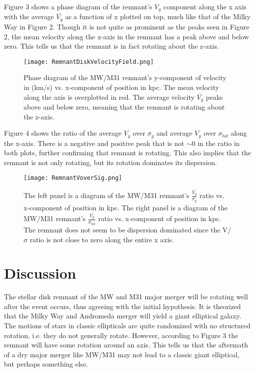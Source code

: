 \documentclass[twocolumn]{aastex63}
\begin{document}

Figure 3 shows a phase diagram of the remnant's $V_y$ component along the x axis with the average $\bar{V_y}$ as a function of x plotted on top, much like that of the Milky Way in Figure 2.  Though it is not quite as prominent as the peaks seen in Figure 2, the mean velocity along the x-axis in the remnant has a peak above and below zero.  This tells us that the remnant is in fact rotating about the z-axis.

\begin{figure}
    \centering
    \texttt{[image: RemnantDiskVelocityField.png]}
    \caption{Phase diagram of the MW/M31 remnant's y-component of velocity in (km/s) vs. x-component of position in kpc.  The mean velocity along the axis is overplotted in red.  The average velocity $\bar{V_y}$ peaks above and below zero, meaning that the remnant is rotating about the z-axis.}
    \label{fig:my_label}
\end{figure}

Figure 4 shows the ratio of the average $V_y$ over $\sigma_{y}$ and average $V_y$ over $\sigma_{tot}$ along the x-axis.  There is a negative and positive peak that is not $\sim$0 in the ratio in both plots, further confirming that remnant is rotating.  This also implies that the remnant is not only rotating, but its rotation dominates its dispersion.  

\begin{figure}
    \centering
    \texttt{[image: RemnantVoverSig.png]}
    \caption{The left panel is a diagram of the MW/M31 remnant's $\frac{\bar{V_y}}{\sigma_y}$ ratio vs. x-component of position in kpc.
    The right panel is a diagram of the MW/M31 remnant's $\frac{\bar{V_y}}{\sigma_{tot}}$ ratio vs. x-component of position in kpc. The remnant does not seem to be dispersion dominated since the V/$\sigma$ ratio is not close to zero along the entire x axis.}
    \label{fig:my_label}
\end{figure}

\section{Discussion} \label{sec:style}

The stellar disk remnant of the MW and M31 major merger will be rotating well after the event occurs, thus agreeing with the initial hypothesis.  It is theorized that the Milky Way and Andromeda merger will yield a giant elliptical galaxy. The motions of stars in classic ellipticals are quite randomized with no structured rotation, i.e. they do not generally rotate.  However, according to Figure 3 the remnant will have some rotation around an axis.  This tells us that the aftermath of a dry major merger like MW/M31 may not lead to a classic giant elliptical, but perhaps something else.             

{}

\end{document}
